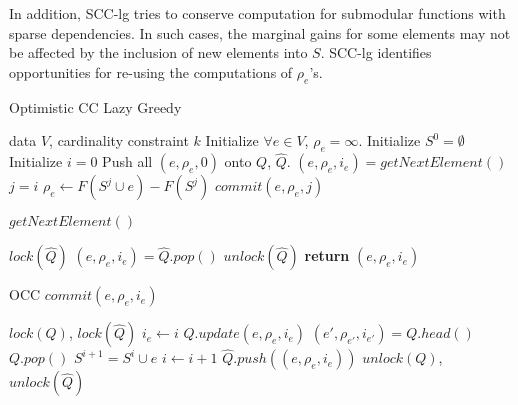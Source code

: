 \documentclass{article}
\newcommand{\occlz}{SCC-lg}
\begin{document}
In addition, \occlz{} tries to conserve computation for submodular functions with sparse dependencies.
In such cases, the marginal gains for some elements may not be affected by the inclusion of new elements into $S$.
\occlz{} identifies opportunities for re-using the computations of $\rho_e$'s.
\begin{algorithm}[tb]
  \caption{Optimistic CC Lazy Greedy}
  \label{alg:scclz}
\begin{algorithmic}[1]
   data $V$, cardinality constraint $k$
  \STATE Initialize $\forall e \in V$, $\rho_e = \infty$.
  \STATE Initialize $S^0 = \emptyset$
  \STATE Initialize $i = 0$
  \STATE Push all $(e, \rho_e, 0)$ onto $Q$, $\widehat{Q}$.
      \STATE $(e, \rho_e, i_e) = getNextElement()$
      \STATE $j = i$
        \STATE $\rho_e     \leftarrow F(S^j \cup e) - F(S^j)$
      \ENDIF
      \STATE $commit(e, \rho_e, j)$
    \ENDWHILE
  \ENDFOR
\end{algorithmic}
\end{algorithm}

\begin{algorithm}[tb]
  \caption{$getNextElement()$}
  \label{alg:scclz:getnext}
\begin{algorithmic}
  \STATE $lock(\widehat{Q})$
  \STATE $(e, \rho_e, i_e) = \widehat{Q}.pop()$
  \STATE $unlock(\widehat{Q})$
  \STATE \textbf{return} $(e, \rho_e, i_e)$
\end{algorithmic}
\end{algorithm}


\begin{algorithm}[tb]
  \caption{OCC $commit(e, \rho_e, i_e)$}
  \label{alg:scclz:commit}
\begin{algorithmic}
  \STATE $lock(Q)$, $lock(\widehat{Q})$
    \STATE $i_e \leftarrow i$
  \ENDIF
  \STATE $Q.update(e, \rho_e, i_e)$
  \STATE $(e', \rho_{e'}, i_{e'}) = Q.head()$
    \STATE $Q.pop()$
    \STATE $S^{i+1} = S^i \cup e$
    \STATE $i \leftarrow i + 1$
  \ELSE
    \STATE $\widehat{Q}.push((e, \rho_e, i_e))$
  \ENDIF
  \STATE $unlock(Q)$, $unlock(\widehat{Q})$
\end{algorithmic}
\end{algorithm}
\end{document}

